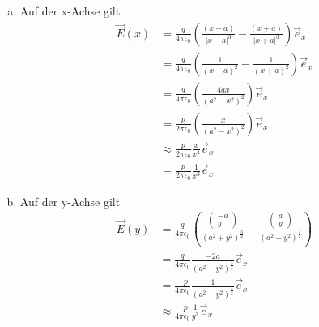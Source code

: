 \begin{enumerate}[(a)]
\item Auf der x-Achse gilt
\begin{align}
  \vec E(x) &= \frac{q}{4 \pi \epsilon_0}\left(\frac{(x-a)}{|x-a|^3}-\frac{(x+a)}{|x+a|^3}\right)\vec e_x\\
  &=\frac{q}{4 \pi \epsilon_0}\left(\frac{1}{(x-a)^2}-\frac{1}{(x+a)^2}\right)\vec e_x\\
  &=\frac{q}{4 \pi \epsilon_0}\left(\frac{4ax}{(a^2-x^2)^2}\right)\vec e_x\\
  &=\frac{p}{2 \pi \epsilon_0}\left(\frac{x}{(a^2-x^2)^2}\right)\vec e_x\\
  &\approx\frac{p}{2 \pi \epsilon_0}\frac{x}{x^4}\vec e_x\\
  &=\frac{p}{2 \pi \epsilon_0}\frac{1}{x^3}\vec e_x
\end{align}

\item Auf der y-Achse gilt
\begin{align}
\vec E(y) &= \frac{q}{4 \pi \epsilon_0}\left(\frac{\begin{pmatrix} -a\\y \end{pmatrix}}{(a^2+y^2)^{\frac{3}{2}}}-\frac{\begin{pmatrix} a\\y \end{pmatrix}}{(a^2+y^2)^{\frac{3}{2}}}\right)\\
 &= \frac{q}{4 \pi \epsilon_0}\frac{-2a}{(a^2+y^2)^{\frac{3}{2}}} \vec e_x\\
 &= \frac{-p}{4 \pi \epsilon_0}\frac{1}{(a^2+y^2)^{\frac{3}{2}}} \vec e_x\\
 &\approx \frac{-p}{4 \pi \epsilon_0}\frac{1}{y^3} \vec e_x
\end{align}

\end{enumerate}